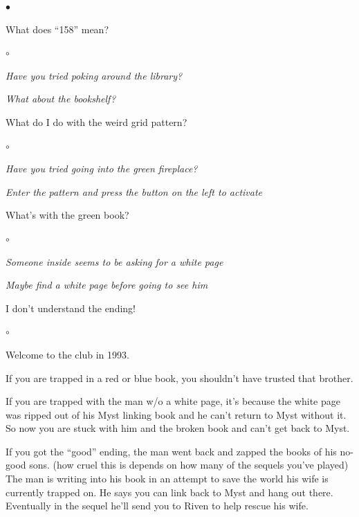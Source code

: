 \documentclass{book}
\newenvironment{list1}%
{\begin{list}{$\bullet$}{\setlength{\parsep}{0.05ex}\setlength{\itemsep}{0mm}}}
{\end{list}\normalsize}
\newenvironment{list2}%
{\begin{list}{$\circ$}{\setlength{\parsep}{0.05ex}\setlength{\itemsep}{0mm}}}
{\end{list}\normalsize}
\begin{document}
\begin{list1}
	\item What does ``158'' mean?
		\begin{list2}
		\item {\em Have you tried poking around the library?}
		\item {\em What about the bookshelf?}
		\end{list2}

	\item What do I do with the weird grid pattern?
		\begin{list2}
		\item {\em Have you tried going into the green fireplace?}
		\item {\em Enter the pattern and press the button on the left
			to activate}
		\end{list2}

	\item What's with the green book?
		\begin{list2}
		\item {\em Someone inside seems to be asking for a white page}
		\item {\em Maybe find a white page before going to see him}
		\end{list2}
\pagebreak
	\item I don't understand the ending!
		\begin{list2}
		\item Welcome to the club in 1993.
		\item If you are trapped in a red or blue book, you shouldn't
			have trusted that brother.
		\item If you are trapped with the man w/o a white page,
			it's because
			the white page was ripped out of his Myst linking book
			and he can't return to Myst without it.
			So now you are stuck with him and the broken book
			and can't get back to Myst.
		\item If you got the ``good'' ending, the man went back and
			zapped the books of his no-good sons.
			(how cruel this is depends on how many of the
			sequels you've played)
			The man is writing into his book in an 
			attempt to save the world his wife is currently
			trapped on.
			He says you can link back to Myst and hang out there.
			Eventually in the sequel he'll send you to Riven
			to help rescue his wife.
		\end{list2}
\end{list1}
\end{document}
